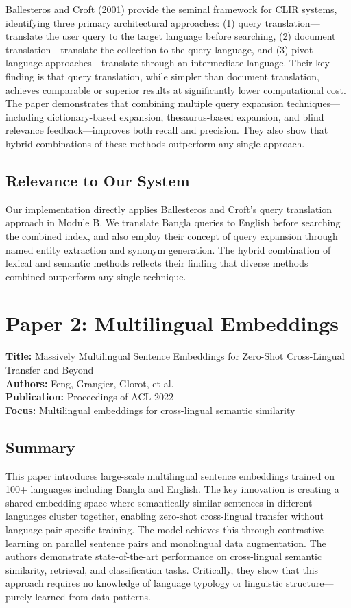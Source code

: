 \documentclass[12pt,a4paper]{report}
\begin{document}
Ballesteros and Croft (2001) provide the seminal framework for CLIR systems, identifying three primary architectural approaches: (1) query translation---translate the user query to the target language before searching, (2) document translation---translate the collection to the query language, and (3) pivot language approaches---translate through an intermediate language. Their key finding is that query translation, while simpler than document translation, achieves comparable or superior results at significantly lower computational cost. The paper demonstrates that combining multiple query expansion techniques---including dictionary-based expansion, thesaurus-based expansion, and blind relevance feedback---improves both recall and precision. They also show that hybrid combinations of these methods outperform any single approach.

\subsection*{Relevance to Our System}

Our implementation directly applies Ballesteros and Croft's query translation approach in Module B. We translate Bangla queries to English before searching the combined index, and also employ their concept of query expansion through named entity extraction and synonym generation. The hybrid combination of lexical and semantic methods reflects their finding that diverse methods combined outperform any single technique.

\vspace{0.5cm}

\section{Paper 2: Multilingual Embeddings}

\textbf{Title:} Massively Multilingual Sentence Embeddings for Zero-Shot Cross-Lingual Transfer and Beyond \\
\textbf{Authors:} Feng, Grangier, Glorot, et al. \\
\textbf{Publication:} Proceedings of ACL 2022 \\
\textbf{Focus:} Multilingual embeddings for cross-lingual semantic similarity

\subsection*{Summary}

This paper introduces large-scale multilingual sentence embeddings trained on 100+ languages including Bangla and English. The key innovation is creating a shared embedding space where semantically similar sentences in different languages cluster together, enabling zero-shot cross-lingual transfer without language-pair-specific training. The model achieves this through contrastive learning on parallel sentence pairs and monolingual data augmentation. The authors demonstrate state-of-the-art performance on cross-lingual semantic similarity, retrieval, and classification tasks. Critically, they show that this approach requires no knowledge of language typology or linguistic structure---purely learned from data patterns.
\end{document}
